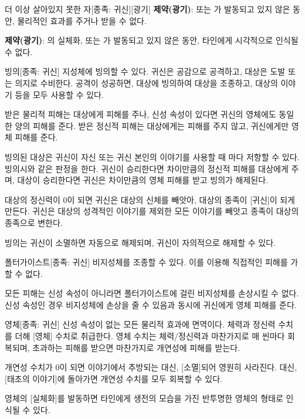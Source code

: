 \documentclass{report}
\begin{document}
	\begin{story}{더 이상 살아있지 못한 자}{[종족: 귀신][광기]}
		\textbf{제약(광기)}:  또는 가 발동되고 있지 않은 동안, 물리적인 효과를 주거나 받을 수 없다.
		
		\textbf{제약(광기)}: 의 실체화,  또는 가 발동되고 있지 않은 동안, 타인에게 시각적으로 인식될 수 없다.
		
	\end{story}
	
	\begin{story}{빙의}{[종족: 귀신]}
		지성체에 빙의할 수 있다. 귀신은 공감으로 공격하고, 대상은 도발 또는 의지로 수비한다. 공격이 성공하면, 대상에 빙의하여 대상을 조종하고, 대상의 이야기 등을 모두 사용할 수 있다.
		
		받은 물리적 피해는 대상에게 피해를 주나, 신성 속성이 있다면 귀신의 영체에도 동일한 양의 피해를 준다. 받은 정신적 피해는 대상에게는 피해를 주지 않고, 귀신에게만 영체 피해를 준다.
		
		빙의된 대상은 귀신이 자신 또는 귀신 본인의 이야기를 사용할 때 마다 저항할 수 있다. 빙의시와 같은 판정을 한다. 귀신이 승리한다면 차이만큼의 정신적 피해를 대상에게 주며, 대상이 승리한다면 귀신은 차이만큼의 영체 피해를 받고 빙의가 해제된다.
		
		대상의 정신력이 0이 되면 귀신은 대상의 신체를 빼앗아, 대상의 종족이 [귀신]이 되게 만든다. 귀신은 대상의 성격적인 이야기를 제외한 모든 이야기를 빼앗고 종족이 대상의 종족으로 변한다.
		
		빙의는 귀신이 소멸하면 자동으로 해제되며, 귀신이 자의적으로 해제할 수 있다.
		
	\end{story}
	
	\begin{story}{폴터가이스트}{[종족: 귀신]}
		비지성체를 조종할 수 있다. 이를 이용해 직접적인 피해를 가할 수 없다.
		
		모든 피해는 신성 속성이 아니라면 폴터가이스트에 걸린 비지성체를 손상시킬 수 없다. 신성 속성인 경우 비지성체에 손상을 줄 수 있음과 동시에 귀신에게 영체 피해를 준다.
		
	\end{story}
	
	\begin{story}{영체}{[종족: 귀신]}
		신성 속성이 없는 모든 물리적 효과에 면역이다. 체력과 정신력 수치를 더해 [영체] 수치로 취급한다. 영체 수치는 체력/정신력과 마찬가지로 매 씬마다 회복되며, 초과하는 피해를 받으면 마찬가지로 개연성에 피해를 받는다.
		
		개연성 수치가 0이 되면 이야기에서 추방되는 대신, [소멸]되어 영원히 사라진다. 대신, [태초의 이야기]에 돌아가면 개연성 수치를 모두 회복할 수 있다.
		
		영체의 [실체화]를 발동하면 타인에게 생전의 모습을 가진 반투명한 영체의 형태로 인식될 수 있다.
		
	\end{story}
\end{document}
